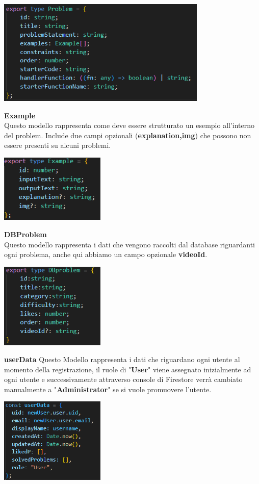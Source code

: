\documentclass[11pt, a4paper]{article}
\theoremstyle{definition}
\begin{document}
\begin{center}
  \includegraphics[width=10cm]{materiale/Problem Template.png}
\end{center}
\newpage
\textbullet   \textbf{ Example}\\
Questo modello rappresenta come deve essere strutturato un esempio all'interno del problem. Include due campi opzionali (\textbf{explanation,img}) che possono non essere presenti su alcuni problemi.

\begin{center}
  \includegraphics[width=5cm]{materiale/Example Template.png}
\end{center}

\newpage
\textbullet   \textbf{ DBProblem}\\
Questo modello rappresenta i dati che vengono raccolti dal database riguardanti ogni problema, anche qui abbiamo un campo opzionale \textbf{videoId}.
\begin{center}
  \includegraphics[width=5cm]{materiale/DBProblem Template.png}
\end{center}
\newpage
\textbullet \textbf{ userData}
Questo Modello rappresenta i dati che riguardano ogni utente al momento della registrazione, il ruole di "\textbf{User}" viene assegnato inizialmente ad ogni utente e successivamente attraverso console di Firestore verrà cambiato manualmente a "\textbf{Administrator}"
se si vuole promuovere l'utente.
\begin{center}
  \includegraphics[width=5cm]{materiale/User Template.png}
\end{center}
\newpage
\end{document}
